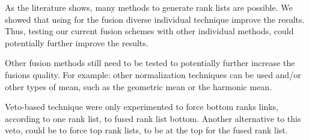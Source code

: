 As the literature shows, many methods to generate rank lists are possible.
We showed that using for the fusion diverse individual technique improve the results.
Thus, testing our current fusion schemes with other individual methods, could potentially further improve the results.

Other fusion methods still need to be tested to potentially further increase the fusions quality.
For example: other normalization techniques can be used and/or other types of mean, such as the geometric mean or the harmonic mean.

Veto-based technique were only experimented to force bottom ranks links, according to one rank list, to fused rank list bottom.
Another alternative to this veto, could be to force top rank lists, to be at the top for the fused rank list.
